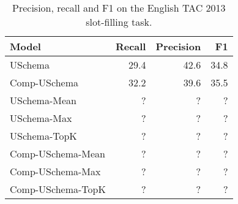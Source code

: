\begin{table}[h!]
\setlength{\tabcolsep}{4.1pt}
\begin{center}
\begin{tabular}{|lrrr|}
\hline
\bf Model & \bf Recall & \bf Precision & \bf F1 \\
\hline\hline
USchema             & 29.4 & 42.6 & 34.8 \\
Comp-USchema                & 32.2 & 39.6 & 35.5  \\
\hline\hline
USchema-Mean        & ? & ? & ? \\
USchema-Max        & ? & ? & ? \\
USchema-TopK        & ? & ? & ? \\
Comp-USchema-Mean        & ? & ? & ? \\
Comp-USchema-Max        & ? & ? & ? \\
Comp-USchema-TopK        & ? & ? & ? \\
\hline\hline

\hline
\end{tabular}
\caption{Precision, recall and F1 on the English TAC 2013 slot-filling task.
\label{en-tac-table}}
\end{center}
\vspace{-.3cm}
\end{table}

